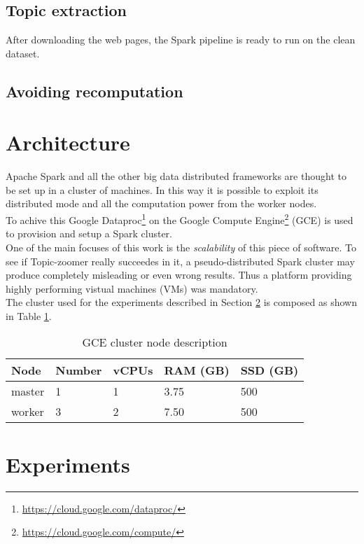\documentclass{sig-alternate-05-2015}
\begin{document}
\subsection{Topic extraction}
After downloading the web pages, the Spark pipeline is ready to run on the clean dataset.
\subsection{Avoiding recomputation}


\section{Architecture}
Apache Spark and all the other big data distributed frameworks are thought to be set up in a cluster of machines. In this way it is possible to exploit its distributed mode and all the computation power from the worker nodes.\\
To achive this Google Dataproc\footnote{\url{https://cloud.google.com/dataproc/}} on the Google Compute Engine\footnote{\url{https://cloud.google.com/compute/}} (GCE) is used to provision and setup a Spark cluster.\\
One of the main focuses of this work is the \emph{scalability} of this piece of software. To see if Topic-zoomer really succeedes in it, a pseudo-distributed Spark cluster may produce completely misleading or even wrong results. Thus a platform providing highly performing vistual machines (VMs) was mandatory.\\
The cluster used for the experiments described in Section \ref{experiments} is composed as shown in Table \ref{cluster}.
\begin{table}[]
\centering
\caption{GCE cluster node description}
\label{cluster}
\begin{tabular}{lllll}
\hline
Node   & Number & vCPUs & RAM (GB) & SSD (GB) \\
\hline
master & 1      & 1     & 3.75     & 500      \\
worker & 3      & 2     & 7.50     & 500     
\end{tabular}
\end{table}


\section{Experiments}\label{experiments}
\end{document}
